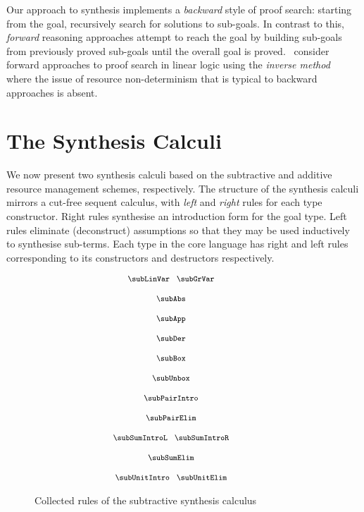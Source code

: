 Our approach to synthesis implements a \textit{backward} style of proof search:
starting from the goal, recursively search for solutions to sub-goals. In
contrast to this, \textit{forward} reasoning approaches attempt to reach the
goal by building sub-goals from previously proved sub-goals until the overall
goal is proved.~\citet{10.1007/11532231_6,10.1007/11538363_15} consider forward
approaches to proof search in linear logic using the \textit{inverse
method}~\citep{DEGTYAREV2001179} where the issue of resource non-determinism
that is typical to backward approaches is absent.


\section{The Synthesis Calculi}
\label{sec:linear-base-synthesis}

We now present two synthesis calculi based on the subtractive and additive resource
management schemes, respectively. The structure of the synthesis calculi mirrors a
cut-free sequent calculus, with
\textit{left} and \textit{right} rules for each type constructor. Right rules
synthesise an introduction form for the goal type. Left rules
eliminate (deconstruct) assumptions so that they may be
used inductively to synthesise sub-terms. Each type in the
core language has right and left
rules corresponding to its constructors and destructors respectively.


\begin{figure}[t]
\begin{gather*}
{\footnotesize{
  \hspace{-3em}\begin{array}{c}
    \subLinVar
    \;\;\;
    \subGrVar
    \\[1.25em]
    \subAbs
    \\[1.25em]
    \subApp
    \\[1.25em]
    \subDer
    \\[1.25em]
    \subBox
    \\[1.25em]
    \subUnbox
    \\[1.25em]
    \subPairIntro
    \\[1.25em]
    \subPairElim
    \\[1.25em]
    \subSumIntroL
    \;\;\;
    \subSumIntroR
    \\[1.25em]
    \subSumElim
    \\[1.25em]
    \subUnitIntro
    \;\;\;
    \subUnitElim
  \end{array}
}}
\end{gather*}
\caption{Collected rules of the subtractive synthesis calculus}
\label{fig:sub-rules}
  \end{figure}



